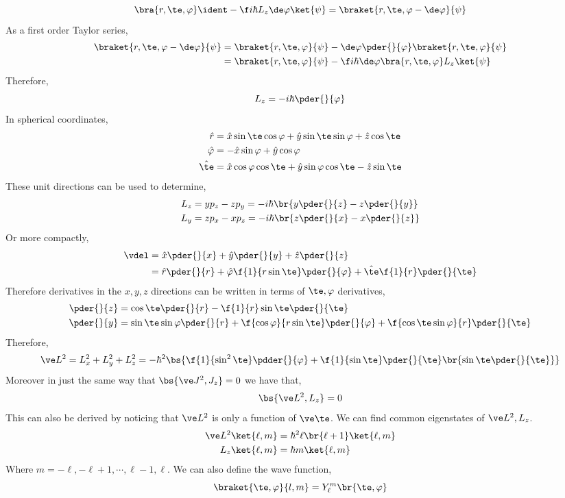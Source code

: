 \documentclass{article}
\begin{document}
\[ \bra{r, \te, \varphi} \ident - \f i \hbar L_z \de \varphi \ket{\psi} = \braket{r, \te, \varphi - \de \varphi}{\psi} \]
As a first order Taylor series,
\begin{align*}
    \braket{r, \te, \varphi - \de \varphi}{\psi}
    &= \braket{r, \te, \varphi}{\psi} - \de \varphi \pder{}{\varphi} \braket{r, \te, \varphi}{\psi} \\
    &= \braket{r, \te, \varphi}{\psi} - \f i \hbar \de \varphi \bra{r, \te, \varphi}L_z\ket{\psi}
\end{align*}
Therefore,
\[ L_z = - i \hbar \pder{}{\varphi} \]
In spherical coordinates,
\begin{align*}
    \hat r &= \hat x \sin \te \cos \varphi + \hat y \sin \te \sin \varphi + \hat z \cos \te \\
    \hat \varphi &= - \hat x \sin \varphi + \hat y \cos \varphi \\
    \hat \te &= \hat x \cos \varphi \cos \te + \hat y \sin \varphi \cos \te - \hat z \sin \te
\end{align*}
These unit directions can be used to determine,
\begin{align*}
L_z &= y p_z - z p_y = - i \hbar \br{y \pder{}{z} - z \pder{}{y}} \\
L_y &= z p_x - x p_z = - i \hbar \br{z \pder{}{x} - x \pder{}{z}}
\end{align*}
Or more compactly,
\begin{align*}
\vdel
&= \hat x \pder{}{x} + \hat y \pder{}{y} + \hat z \pder{}{z} \\
&= \hat r \pder{}{r} + \hat \varphi \f{1}{r \sin \te} \pder{}{\varphi} + \hat \te \f{1}{r}\pder{}{\te}
\end{align*}
Therefore derivatives in the $x,y,z$ directions can be written in terms of $\te, \varphi$ derivatives,
\begin{align*}
    \pder{}{z} &= \cos \te \pder{}{r} - \f{1}{r} \sin \te \pder{}{\te}\\
    \pder{}{y} &=  \sin \te \sin \varphi \pder{}{r} + \f{\cos \varphi}{r \sin \te} \pder{}{\varphi} + \f{\cos \te \sin \varphi}{r} \pder{}{\te}
\end{align*}
Therefore,
\[ \ve L^2 = L_x^2 + L_y^2 + L_z^2 = - \hbar^2 \bs{\f{1}{\sin^2 \te} \pdder{}{\varphi} + \f{1}{\sin \te} \pder{}{\te} \br{\sin \te \pder{}{\te}}} \]
Moreover in just the same way that $\bs{\ve J^2, J_z} = 0$ we have that,
\[ \bs{\ve L^2, L_z} = 0 \]
This can also be derived by noticing that $\ve L^2$ is only a function of $\ve \te$. We can find common eigenstates of $\ve L^2, L_z$.
\begin{align*}
    \ve L^2 \ket{\ell, m} &= \hbar^2 \ell \br{\ell + 1} \ket{\ell, m} \\
    L_z \ket{\ell, m} &= \hbar m \ket{\ell, m}
\end{align*}
Where $m = -\ell, -\ell +1, \cdots, \ell - 1, \ell$. We can also define the wave function,
\[ \braket{\te ,\varphi}{l,m} = Y^{m}_{\ell}\br{\te, \varphi} \]
\end{document}
